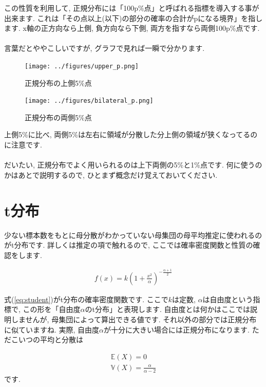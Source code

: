 \documentclass[11pt,a4paper,uplatex]{ujreport} 	%
\begin{document}
この性質を利用して, 正規分布には「100p\%点」と呼ばれる指標を導入する事が出来ます. これは「その点以上(以下)の部分の確率の合計がpになる境界」を指します. x軸の正方向なら上側, 負方向なら下側, 両方を指すなら両側100p\%点です. \\\\

言葉だとややこしいですが, グラフで見れば一瞬で分かります.


\begin{figure}[H]
\label{im:upper}
  \centering
  \texttt{[image: ../figures/upper\_p.png]}
  \caption{正規分布の上側5\%点}
\end{figure}

\begin{figure}[H]
\label{im:bilateral}
  \centering
  \texttt{[image: ../figures/bilateral\_p.png]}
  \caption{正規分布の両側5\%点}
\end{figure}

上側5\%に比べ, 両側5\%は左右に領域が分散した分上側の領域が狭くなってるのに注意です. \\
\\

だいたい, 正規分布でよく用いられるのは上下両側の5\%と1\%点です. 何に使うのかはあとで説明するので, ひとまず概念だけ覚えておいてください.

\section{t分布}
少ない標本数をもとに母分散がわかっていない母集団の母平均推定に使われるのがt分布です. 詳しくは推定の項で触れるので, ここでは確率密度関数と性質の確認をします.

\begin{align}
\label{eq:student}
f(x) = k(1 + \frac{x^2}{\alpha})^{-\frac{\alpha+1}{2}}
\end{align}

式(\ref{eq:student})がt分布の確率密度関数です. ここで$k$は定数, $\alpha$は自由度という指標で, この形を「自由度$\alpha$のt分布」と表現します. 自由度とは何かはここでは説明しませんが, 母集団によって算出できる値です. それ以外の部分では正規分布に似ていますね. 実際, 自由度$\alpha$が十分に大きい場合には正規分布になります. ただこいつの平均と分散は

\begin{align}
\mathbb{E}(X) = 0\\
\mathbb{V}(X) = \frac{\alpha}{\alpha-2}
\end{align}
です. 
\end{document}
